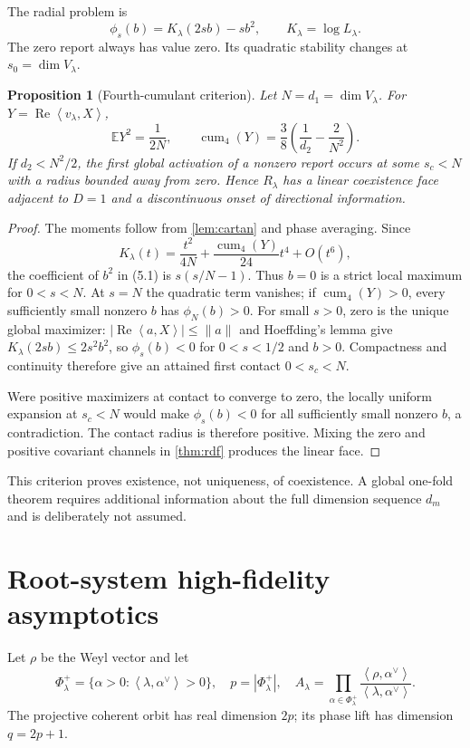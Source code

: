 \documentclass[11pt,a4paper]{article}
\newtheorem{proposition}[theorem]{Proposition}
\newcommand{\E}{\mathbb E}
\newcommand{\ip}[2]{\left\langle #1,#2\right\rangle}
\DeclareMathOperator{\cum}{cum}
\DeclareMathOperator{\Rea}{Re}
\begin{document}
The radial problem is
\[
 \phi_s(b)=K_\lambda(2sb)-sb^2,
 \qquad K_\lambda=\log L_\lambda.
 \tag{5.1}
\]
The zero report always has value zero.  Its quadratic stability changes at
$s_0=\dim V_\lambda$.

\begin{proposition}[Fourth-cumulant criterion]\label{prop:cumulant}
Let $N=d_1=\dim V_\lambda$.  For
$Y=\Rea\ip{v_\lambda}{X}$,
\[
 \E Y^2=\frac1{2N},\qquad
 \cum_4(Y)=\frac38\left(\frac1{d_2}-\frac2{N^2}\right).
 \tag{5.2}
\]
If $d_2<N^2/2$, the first global activation of a nonzero report occurs at
some $s_c<N$ with a radius bounded away from zero.  Hence $R_\lambda$ has a
linear coexistence face adjacent to $D=1$ and a discontinuous onset of
directional information.
\end{proposition}

\begin{proof}
The moments follow from \cref{lem:cartan} and phase averaging.  Since
\[
 K_\lambda(t)=\frac{t^2}{4N}
 +\frac{\cum_4(Y)}{24}t^4+O(t^6),
\]
the coefficient of $b^2$ in (5.1) is
$s(s/N-1)$.  Thus $b=0$ is a strict local maximum for $0<s<N$.  At $s=N$
the quadratic term vanishes; if $\cum_4(Y)>0$, every sufficiently small
nonzero $b$ has $\phi_N(b)>0$.  For small $s>0$, zero is the unique global
maximizer: $|\Rea\ip{a}{X}|\le\|a\|$ and Hoeffding's lemma give
$K_\lambda(2sb)\le2s^2b^2$, so $\phi_s(b)<0$ for $0<s<1/2$ and $b>0$.
Compactness and continuity therefore give an attained first contact
$0<s_c<N$.

Were positive maximizers at contact to converge to zero, the locally
uniform expansion at $s_c<N$ would make $\phi_s(b)<0$ for all sufficiently
small nonzero $b$, a contradiction.  The contact radius is therefore
positive.  Mixing the zero and positive covariant channels in
\cref{thm:rdf} produces the linear face.
\end{proof}

This criterion proves existence, not uniqueness, of coexistence.  A global
one-fold theorem requires additional information about the full dimension
sequence $d_m$ and is deliberately not assumed.

\section{Root-system high-fidelity asymptotics}

Let $\rho$ be the Weyl vector and let
\[
 \Phi_\lambda^+=\{\alpha>0:
 \ip{\lambda}{\alpha^\vee}>0\},\quad
 p=|\Phi_\lambda^+|,\quad
 A_\lambda=\prod_{\alpha\in\Phi_\lambda^+}
 \frac{\ip{\rho}{\alpha^\vee}}{\ip{\lambda}{\alpha^\vee}}.
 \tag{6.1}
\]
The projective coherent orbit has real dimension $2p$; its phase lift has
dimension $q=2p+1$.
\end{document}
